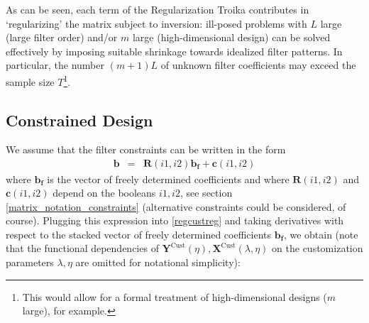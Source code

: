 \documentclass[a4paper]{book}
\begin{document}
As can be seen, each term of the Regularization Troika contributes in `regularizing' the matrix subject to inversion: ill-posed problems with $L$ large (large filter order) and/or $m$ large (high-dimensional design) can be solved effectively by imposing suitable shrinkage towards idealized filter patterns. In particular, the number $(m+1)L$ of unknown filter coefficients may exceed the sample size $T$\footnote{This would allow for a formal treatment of high-dimensional designs ($m$ large), for example.}.  



\subsection{Constrained Design}

We assume that the filter constraints can be written in the form
\begin{eqnarray}\label{cons5s}
\mathbf{b}&=&\mathbf{R}(i1,i2) \mathbf{b_{f}}+\mathbf{c}(i1,i2)
\end{eqnarray}
where $\mathbf{b_f}$ is the vector of freely determined coefficients and where $\mathbf{R}(i1,i2)$ and $\mathbf{c}(i1,i2)$ depend on the booleans $i1,i2$, see section \ref{matrix_notation_constraints} (alternative constraints could be considered, of course). Plugging this expression into \ref{regcustreg} and taking derivatives with respect to the stacked vector of freely determined coefficients $\mathbf{b_{f}}$, we obtain (note that the functional dependencies of $\mathbf{Y}^{\textrm{Cust}}(\eta), \mathbf{X}^{\textrm{Cust}}(\lambda,\eta)$ on the customization parameters $\lambda,\eta$ are omitted for notational simplicity):
\end{document}
